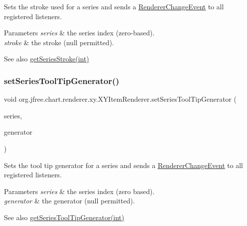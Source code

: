 Sets the stroke used for a series and sends a \mbox{\hyperlink{}{Renderer\+Change\+Event}} to all registered listeners.


\begin{DoxyParams}{Parameters}
{\em series} & the series index (zero-\/based). \\
\hline
{\em stroke} & the stroke ({\ttfamily null} permitted).\\
\hline
\end{DoxyParams}
\begin{DoxySeeAlso}{See also}
\mbox{\hyperlink{interfaceorg_1_1jfree_1_1chart_1_1renderer_1_1xy_1_1_x_y_item_renderer_a424b6a0660bc162300ba763f2c6656ea}{get\+Series\+Stroke(int)}} 
\end{DoxySeeAlso}
\mbox{\label{interfaceorg_1_1jfree_1_1chart_1_1renderer_1_1xy_1_1_x_y_item_renderer_a4198dcc9fc6534f6373dad286980d12b}} 
\subsubsection{\texorpdfstring{set\+Series\+Tool\+Tip\+Generator()}{setSeriesToolTipGenerator()}}
{\footnotesize\ttfamily void org.\+jfree.\+chart.\+renderer.\+xy.\+X\+Y\+Item\+Renderer.\+set\+Series\+Tool\+Tip\+Generator (\begin{DoxyParamCaption}\item[{int}]{series,  }\item[{\mbox{\hyperlink{interfaceorg_1_1jfree_1_1chart_1_1labels_1_1_x_y_tool_tip_generator}{X\+Y\+Tool\+Tip\+Generator}}}]{generator }\end{DoxyParamCaption})}

Sets the tool tip generator for a series and sends a \mbox{\hyperlink{}{Renderer\+Change\+Event}} to all registered listeners.


\begin{DoxyParams}{Parameters}
{\em series} & the series index (zero based). \\
\hline
{\em generator} & the generator ({\ttfamily null} permitted).\\
\hline
\end{DoxyParams}
\begin{DoxySeeAlso}{See also}
\mbox{\hyperlink{interfaceorg_1_1jfree_1_1chart_1_1renderer_1_1xy_1_1_x_y_item_renderer_abd9e042bb8bfa4f20a45346e850710b8}{get\+Series\+Tool\+Tip\+Generator(int)}} 
\end{DoxySeeAlso}


